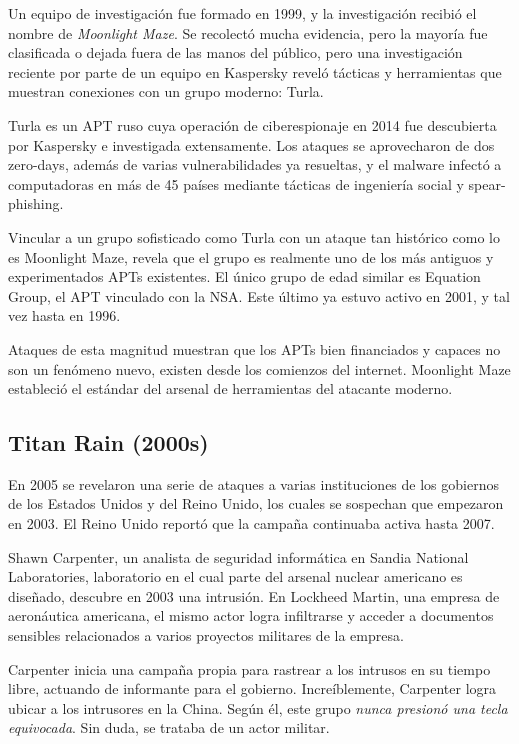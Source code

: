 \documentclass{article}
\begin{document}
Un equipo de investigación fue formado en 1999, y la investigación recibió el nombre de {\it Moonlight Maze}. Se recolectó mucha evidencia, pero la mayoría fue clasificada o dejada fuera de las manos del público, pero una investigación reciente por parte de un equipo en Kaspersky reveló tácticas y herramientas que muestran conexiones con un grupo moderno: Turla.

Turla es un APT ruso cuya operación de ciberespionaje en 2014 fue descubierta por Kaspersky e investigada extensamente. Los ataques se aprovecharon de dos zero-days, además de varias vulnerabilidades ya resueltas, y el malware infectó a computadoras en más de 45 países mediante tácticas de ingeniería social y spear-phishing. \autocite{securelist-turla}

Vincular a un grupo sofisticado como Turla con un ataque tan histórico como lo es Moonlight Maze, revela que el grupo es realmente uno de los más antiguos y experimentados APTs existentes. El único grupo de edad similar es Equation Group, el APT vinculado con la NSA. Este último ya estuvo activo en 2001, y tal vez hasta en 1996. \autocite{securelist-equation}

Ataques de esta magnitud muestran que los APTs bien financiados y capaces no son un fenómeno nuevo, existen desde los comienzos del internet. Moonlight Maze estableció el estándar del arsenal de herramientas del atacante moderno. 

\subsection{Titan Rain (2000s)}
En 2005 se revelaron una serie de ataques a varias instituciones de los gobiernos de los Estados Unidos y del Reino Unido, los cuales se sospechan que empezaron en 2003. El Reino Unido reportó que la campaña continuaba activa hasta 2007. \autocite{cfr-titan-rain}

Shawn Carpenter, un analista de seguridad informática en Sandia National Laboratories, laboratorio en el cual parte del arsenal nuclear americano es diseñado, descubre en 2003 una intrusión. En Lockheed Martin, una empresa de aeronáutica americana, el mismo actor logra infiltrarse y acceder a documentos sensibles relacionados a varios proyectos militares de la empresa.

Carpenter inicia una campaña propia para rastrear a los intrusos en su tiempo libre, actuando de informante para el gobierno. Increíblemente, Carpenter logra ubicar a los intrusores en la China. Según él, este grupo {\it nunca presionó una tecla equivocada}. Sin duda, se trataba de un actor militar.\autocite{time-titan-rain} \autocite{homelandsecurity-titan-rain}
\end{document}
